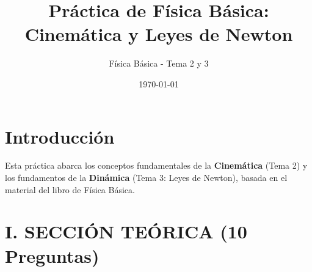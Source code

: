 \documentclass[12pt]{article}
\title{Práctica de Física Básica: Cinemática y Leyes de Newton}
\author{Física Básica - Tema 2 y 3}
\date{\today}
\begin{document}
\maketitle

\section*{Introducción}
Esta práctica abarca los conceptos fundamentales de la \textbf{Cinemática} (Tema 2) y los fundamentos de la \textbf{Dinámica} (Tema 3: Leyes de Newton), basada en el material del libro de Física Básica.

\hr
\section*{I. SECCIÓN TEÓRICA (10 Preguntas)}
\end{document}
